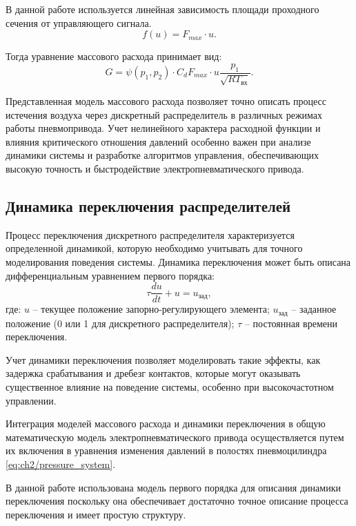 В данной работе используется линейная зависимость площади проходного сечения от управляющего сигнала.
\begin{equation*}
    f(u) = F_{max} \cdot u.
\end{equation*}

Тогда уравнение массового расхода принимает вид:
\begin{equation}
\label{eq:ch2/mass_flow}
    G = \psi(p_1, p_2) \cdot C_d F_{max} \cdot u \frac{p_1}{\sqrt{RT_\text{вх}}}.
\end{equation}

Представленная модель массового расхода позволяет точно описать процесс истечения
воздуха через дискретный распределитель в различных режимах работы
пневмопривода. Учет нелинейного характера расходной функции и
влияния критического отношения давлений особенно важен при анализе динамики
системы и разработке алгоритмов управления, обеспечивающих высокую точность
и быстродействие электропневматического привода.

\subsection{Динамика переключения распределителей}\label{sec:ch2/sec3/subsec2}

Процесс переключения дискретного распределителя характеризуется
определенной динамикой, которую необходимо учитывать для точного моделирования поведения
системы. Динамика переключения может быть описана дифференциальным уравнением первого порядка:
\begin{equation}
\label{eq:ch2/switching_dynamics}
    \tau \frac{du}{dt} + u = u_{зад},
\end{equation}
где:
$u$ -- текущее положение запорно-регулирующего элемента;
$u_{зад}$ -- заданное положение (0 или 1 для дискретного распределителя);
$\tau$ -- постоянная времени переключения.

Учет динамики переключения позволяет моделировать такие эффекты, как задержка
срабатывания и дребезг контактов, которые могут оказывать
существенное влияние на поведение системы,
особенно при высокочастотном управлении.

Интеграция моделей массового расхода и динамики переключения
в общую математическую модель электропневматического привода
осуществляется путем их включения в уравнения
изменения давлений в полостях пневмоцилиндра \ref{eq:ch2/pressure_system}.

В данной работе использована модель первого порядка для описания динамики переключения
поскольку она обеспечивает достаточно точное описание процесса переключения
и имеет простую структуру.


